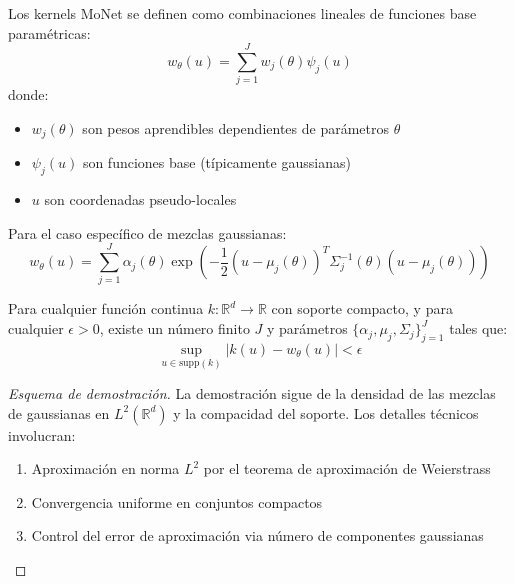 \begin{definition}\label{def:kernel_monet}
Los kernels MoNet se definen como combinaciones lineales de funciones base paramétricas:
\begin{equation}
w_\theta(u) = \sum_{j=1}^J w_j(\theta) \psi_j(u)
\end{equation}
donde:
\begin{itemize}
    \item $w_j(\theta)$ son pesos aprendibles dependientes de parámetros $\theta$
    \item $\psi_j(u)$ son funciones base (típicamente gaussianas)
    \item $u$ son coordenadas pseudo-locales
\end{itemize}

Para el caso específico de mezclas gaussianas:
\begin{equation}
w_\theta(u) = \sum_{j=1}^J \alpha_j(\theta) \exp\left(-\frac{1}{2}(u - \mu_j(\theta))^T \Sigma_j^{-1}(\theta) (u - \mu_j(\theta))\right)
\end{equation}
\end{definition}

\begin{theorem}\label{thm:universal_approximation_monet}
Para cualquier función continua $k: \mathbb{R}^d \to \mathbb{R}$ con soporte compacto, y para cualquier $\epsilon > 0$, existe un número finito $J$ y parámetros $\{\alpha_j, \mu_j, \Sigma_j\}_{j=1}^J$ tales que:
\begin{equation}
\sup_{u \in \text{supp}(k)} |k(u) - w_\theta(u)| < \epsilon
\end{equation}
\end{theorem}

\begin{proof}[Esquema de demostración]
La demostración sigue de la densidad de las mezclas de gaussianas en $L^2(\mathbb{R}^d)$ y la compacidad del soporte. Los detalles técnicos involucran:
\begin{enumerate}
    \item Aproximación en norma $L^2$ por el teorema de aproximación de Weierstrass
    \item Convergencia uniforme en conjuntos compactos
    \item Control del error de aproximación via número de componentes gaussianas
\end{enumerate}
\end{proof}

